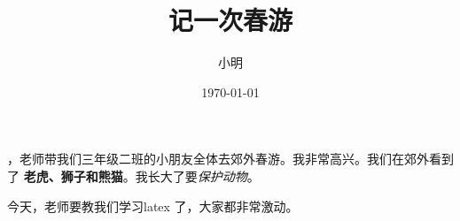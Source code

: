 \documentclass[a4paper]{ctexart}
\author{小明}
\title{记一次春游}
\date{\today}
\begin{document}
  \pagestyle{plain}
  \maketitle
  ，老师带我们三年级二班的小朋友全体去郊外春游。我非常高兴。我们在郊外看到了
  \textbf{老虎、狮子和熊猫}。我长大了要\textsl{保护动物}。

  今天，老师要教我们学习latex 了，大家都非常激动。
\end{document}
